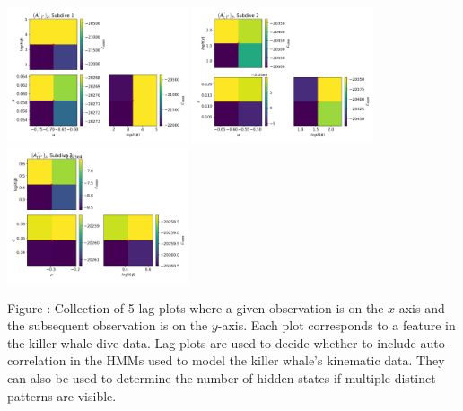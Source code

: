 \documentclass{article}
\begin{document}
        \begin{center}
        \includegraphics[width=2.1in]{../Plots/2019/20190902-182840-CATs_OB_1_0_267_CarHHMM2_fine-theta-likelihood-Az-0.png}
        \includegraphics[width=2.1in]{../Plots/2019/20190902-182840-CATs_OB_1_0_267_CarHHMM2_fine-theta-likelihood-Az-1.png}
        \includegraphics[width=2.1in]{../Plots/2019/20190902-182840-CATs_OB_1_0_267_CarHHMM2_fine-theta-likelihood-Az-2.png}
        \end{center}
        
        \noindent Figure : Collection of 5 lag plots where a given observation is on the $x$-axis and the subsequent observation is on the $y$-axis. Each plot corresponds to a feature in the killer whale dive data. Lag plots are used to decide whether to include auto-correlation in the HMMs used to model the killer whale's kinematic data. They can also be used to determine the number of hidden states if multiple distinct patterns are visible. 
        \addtocounter{fignum}{1}
        
\end{document}
